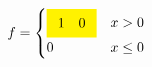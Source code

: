 \documentclass{article}
\begin{document}
\[ f=\begin{cases}
\colorbox{yellow}{$\begin{array}{cc}1 &0\end{array}$} & x>0\\
0 & x\le 0
\end{cases} \]
\end{document}
